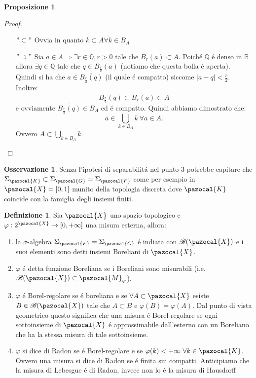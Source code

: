 \documentclass[11pt,a4paper]{report}
\theoremstyle{plain}
\theoremstyle{definition}
\newtheorem{defn}[thm]{Definizione} %
\newtheorem{prop}[thm]{Proposizione} %
\newtheorem{oss}[thm]{Osservazione} %
\newcommand{\M}{\pazocal{M}_\varphi}
\newcommand{\X}{\pazocal{X}}
\newcommand{\K}{\pazocal{K}}
\newcommand{\F}{\pazocal{F}}
\newcommand{\G}{\pazocal{G}}
\newcommand{\B}{\mathcal{B}}
\begin{document}
\begin{prop}
\begin{proof}
\begin{enumerate}
				\begin{itemize}
				\item[$"\subset"$] Ovvia in quanto $k \subset A \forall k \in B_A$
				\item[$"\supset"$] Sia $a \in A \Rightarrow \exists r \in \mathbb{Q}, r > 0$ tale che $B_r(a) \subset A$. Poich\'e $\mathbb{Q}$ \'e denso in $\mathbb{R}$ allora $\exists q \in \mathbb{Q}$ tale che $q \in B_{\frac{r}{2}}(a)$ (notiamo che questa bolla \'e aperta). Quindi si ha che $a \in \overline{B_{\frac{r}{2}}(q)}$ (il quale \'e compatto) siccome $|a-q|<\frac{r}{2}$. Inoltre:
				\[
					\overline{B_{\frac{r}{2}}(q)} \subset B_r(a) \subset A
				\] 
				e ovviamente $\overline{B_{\frac{r}{2}}(q)} \in B_A$ ed \'e compatto. Quindi abbiamo dimostrato che:
				\[
					a \in \bigcup\limits_{k \in B_A} k \ \forall a \in A.				
				\]
				Ovvero $A \subset \bigcup\limits_{k \in B_A} k$.
				\end{itemize}
			\end{enumerate}
		\end{proof}

\end{prop}

\begin{oss}
	Senza l'ipotesi di separabilit\'a nel punto 3 potrebbe capitare che $\Sigma_\K \subset \Sigma_\G = \Sigma_\F$ come per esempio in $\X = [0,1]$ munito della topologia discreta dove $\K$ coincide con la famiglia degli insiemi finiti.
\end{oss}

\begin{defn}
	Sia $\X$ uno spazio topologico e $\varphi : 2^\X \rightarrow [0,+\infty]$ una misura esterna, allora:
	\begin{enumerate}
		\item la $\sigma$-algebra $\Sigma_\F = \Sigma_\G$ \'e indiata con $\mathcal{B}(\X)$ e i suoi elementi sono detti insiemi Boreliani di $\X$.
		\item $\varphi$ \'e detta funzione Boreliana se i Boreliani sono misurabili (i.e. $\B(\X) \subset \M$).
		\item $\varphi$ \'e Borel-regolare se \'e boreliana e se $\forall A \subset \X$ esiste $B \in \B(\X)$ tale che $A \subset B$ e $\varphi(B) = \varphi(A)$. Dal punto di vista geometrico questo significa che una misura \'e Borel-regolare se ogni sottoinsieme di $\X$ \'e approssimabile dall'esterno con un Boreliano che ha la stessa misura di tale sottoinsieme.
		\item $\varphi$ si dice di Radon se \'e Borel-regolare e se $\varphi(k) < +\infty \ \forall k \in \K$. Ovvero una misura si dice di Radon se \'e finita sui compatti. Anticipiamo che la misura di Lebesgue \'e di Radon, invece non lo \'e la misura di Hausdorff
	\end{enumerate}
\end{defn}
\end{document}
